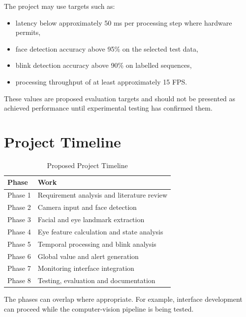 \documentclass[12pt]{tietreport}
\begin{document}
The project may use targets such as:

\begin{itemize}[leftmargin=*]
    \item latency below approximately 50 ms per processing step where
    hardware permits,
    \item face detection accuracy above 95\% on the selected test
    data,
    \item blink detection accuracy above 90\% on labelled sequences,
    \item processing throughput of at least approximately 15 FPS.
\end{itemize}

These values are proposed evaluation targets and should not be
presented as achieved performance until experimental testing has
confirmed them.


\chapter{Project Timeline}

\begin{table}[H]
\centering
\caption{Proposed Project Timeline}
\begin{tabular}{p{}p{}}
\toprule
\textbf{Phase} & \textbf{Work} \\
\midrule
Phase 1 & Requirement analysis and literature review \\
Phase 2 & Camera input and face detection \\
Phase 3 & Facial and eye landmark extraction \\
Phase 4 & Eye feature calculation and state analysis \\
Phase 5 & Temporal processing and blink analysis \\
Phase 6 & Global value and alert generation \\
Phase 7 & Monitoring interface integration \\
Phase 8 & Testing, evaluation and documentation \\
\bottomrule
\end{tabular}
\end{table}

The phases can overlap where appropriate. For example, interface
development can proceed while the computer-vision pipeline is being
tested.
\end{document}
